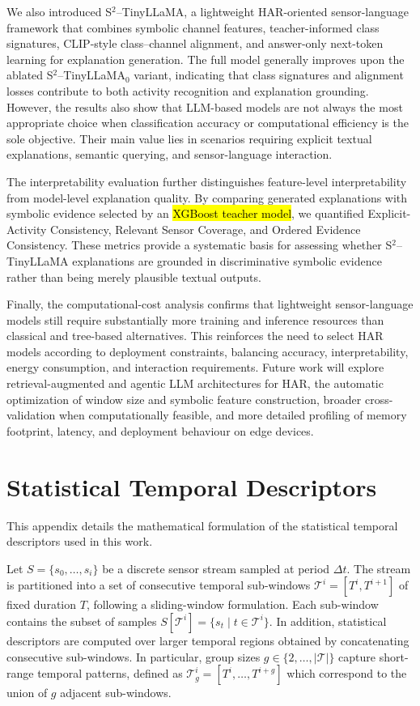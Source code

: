 \documentclass[preprint,12pt]{elsarticle}
\begin{document}
We also introduced S$^2$--TinyLLaMA, a lightweight HAR-oriented sensor-language framework that combines symbolic channel features, teacher-informed class signatures, CLIP-style class--channel alignment, and answer-only next-token learning for explanation generation. The full model generally improves upon the ablated S$^2$--TinyLLaMA$_0$ variant, indicating that class signatures and alignment losses contribute to both activity recognition and explanation grounding. However, the results also show that LLM-based models are not always the most appropriate choice when classification accuracy or computational efficiency is the sole objective. Their main value lies in scenarios requiring explicit textual explanations, semantic querying, and sensor-language interaction.

The interpretability evaluation further distinguishes feature-level interpretability from model-level explanation quality. By comparing generated explanations with symbolic evidence selected by an \hl{XGBoost teacher model}, we quantified Explicit-Activity Consistency, Relevant Sensor Coverage, and Ordered Evidence Consistency. These metrics provide a systematic basis for assessing whether S$^2$--TinyLLaMA explanations are grounded in discriminative symbolic evidence rather than being merely plausible textual outputs.

Finally, the computational-cost analysis confirms that lightweight sensor-language models still require substantially more training and inference resources than classical and tree-based alternatives. This reinforces the need to select HAR models according to deployment constraints, balancing accuracy, interpretability, energy consumption, and interaction requirements. Future work will explore retrieval-augmented and agentic LLM architectures for HAR, the automatic optimization of window size and symbolic feature construction, broader cross-validation when computationally feasible, and more detailed profiling of memory footprint, latency, and deployment behaviour on edge devices.



\appendix
\section{Statistical Temporal Descriptors}
\label{app:statistical_descriptors}

This appendix details the mathematical formulation of the statistical temporal descriptors used in this work.

Let $S=\{s_0,\ldots,s_i\}$ be a discrete sensor stream sampled at period $\Delta t$. The stream is partitioned into a set of consecutive temporal sub-windows $\mathcal{T}^i = [T^i, T^{i+1}]$ of fixed duration $T$, following a
sliding-window formulation. Each sub-window contains the subset of samples $S[\mathcal{T}^i] = \{s_t \mid t \in \mathcal{T}^i\}$. In addition, statistical descriptors are computed over larger temporal regions obtained by concatenating consecutive sub-windows. In particular, group sizes $g \in \{2,\ldots,|\mathcal{T}|\}$ capture short-range temporal patterns, defined as $\mathcal{T}^i_g = [T^{i}, \ldots, T^{i+g}]$ which correspond to the union of $g$ adjacent sub-windows.
\end{document}
